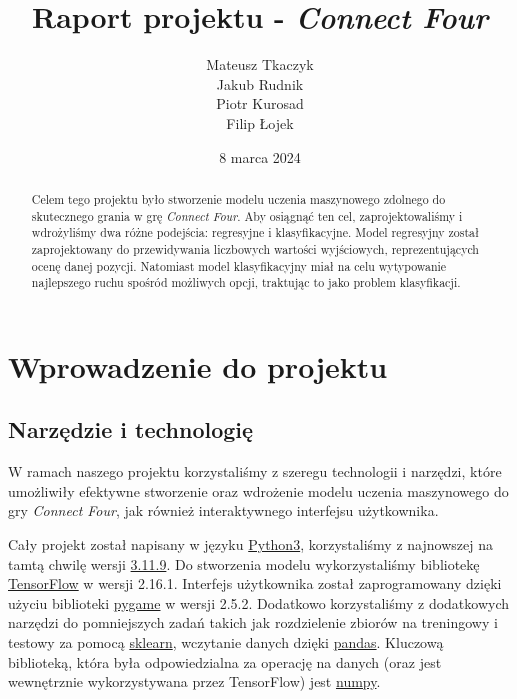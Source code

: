 \documentclass[12pt]{article}
\title{Raport projektu - \textit{Connect Four}}
\author{Mateusz Tkaczyk \\ Jakub Rudnik \\ Piotr Kurosad \\ Filip Łojek}
\date{8 marca 2024}
\begin{document}
\maketitle

\begin{abstract}
    Celem tego projektu było stworzenie modelu uczenia maszynowego zdolnego do skutecznego grania w grę \textit{Connect Four}. Aby osiągnąć ten cel, zaprojektowaliśmy i wdrożyliśmy dwa różne podejścia: regresyjne i klasyfikacyjne. Model regresyjny został zaprojektowany do przewidywania liczbowych wartości wyjściowych, reprezentujących ocenę danej pozycji. Natomiast model klasyfikacyjny miał na celu wytypowanie najlepszego ruchu spośród możliwych opcji, traktując to jako problem klasyfikacji.
\end{abstract}

\clearpage

\tableofcontents

\clearpage

\section{Wprowadzenie do projektu}

\subsection{Narzędzie i technologię}

W ramach naszego projektu korzystaliśmy z szeregu technologii i narzędzi, które umożliwiły efektywne stworzenie oraz wdrożenie modelu uczenia maszynowego do gry \textit{Connect Four}, jak również interaktywnego interfejsu użytkownika.

Cały projekt został napisany w języku \href{https://www.python.org/}{Python3}, korzystaliśmy z najnowszej na tamtą chwilę wersji \href{https://www.python.org/downloads/release/python-3119/}{3.11.9}. Do stworzenia modelu wykorzystaliśmy bibliotekę \href{https://www.tensorflow.org/}{TensorFlow} w wersji 2.16.1. Interfejs użytkownika został zaprogramowany dzięki użyciu biblioteki \href{https://www.pygame.org}{pygame} w wersji 2.5.2. Dodatkowo korzystaliśmy z dodatkowych narzędzi do pomniejszych zadań takich jak rozdzielenie zbiorów na treningowy i testowy za pomocą \href{https://scikit-learn.org/}{sklearn}, wczytanie danych dzięki \href{https://pandas.pydata.org/}{pandas}. Kluczową biblioteką, która była odpowiedzialna za operację na danych (oraz jest wewnętrznie wykorzystywana przez TensorFlow) jest \href{https://numpy.org/}{numpy}.
\end{document}
